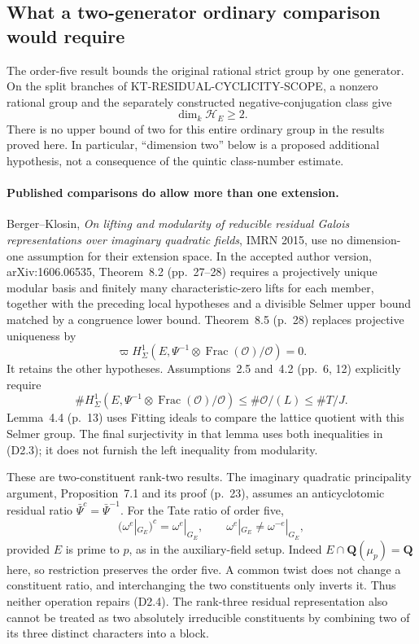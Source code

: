 \subsection{What a two-generator ordinary comparison would require}

The order-five result bounds the original rational strict group by
one generator.  On the split branches of
KT-RESIDUAL-CYCLICITY-SCOPE, a nonzero rational group and the
separately constructed negative-conjugation class give
\[
 \dim_k\mathcal H_E\geq2.                                      \tag{D2.1}
\]
There is no upper bound of two for this entire ordinary group in
the results proved here.  In particular, ``dimension two'' below
is a proposed additional hypothesis, not a consequence of the
quintic class-number estimate.

\paragraph{Published comparisons do allow more than one extension.}
Berger--Klosin, \emph{On lifting and modularity of reducible residual
Galois representations over imaginary quadratic fields}, IMRN 2015,
use no dimension-one assumption for their extension space.
In the accepted author version, arXiv:1606.06535, Theorem~8.2
(pp.~27--28) requires a projectively unique modular basis and
finitely many characteristic-zero lifts for each member, together
with the preceding local hypotheses and a divisible Selmer upper
bound matched by a congruence lower bound.  Theorem~8.5 (p.~28)
replaces projective uniqueness by
\[
 \varpi H^1_\Sigma
       (E,\Psi^{-1}\otimes\operatorname{Frac}(\mathcal O)/\mathcal O)
       =0.                                                     \tag{D2.2}
\]
It retains the other hypotheses.  Assumptions~2.5 and~4.2
(pp.~6, 12) explicitly require
\[
 \#H^1_\Sigma(E,\Psi^{-1}\otimes
              \operatorname{Frac}(\mathcal O)/\mathcal O)
       \leq\#\mathcal O/(L)\leq\#T/J.                          \tag{D2.3}
\]
Lemma~4.4 (p.~13) uses Fitting ideals to compare the lattice
quotient with this Selmer group.  The final surjectivity in that
lemma uses both inequalities in (D2.3); it does not furnish the
left inequality from modularity.

These are two-constituent rank-two results.  The imaginary
quadratic principality argument, Proposition~7.1 and its proof
(p.~23), assumes an anticyclotomic residual ratio
$\bar\Psi^c=\bar\Psi^{-1}$.  For the Tate ratio of order five,
\[
 (\omega^{e}|_{G_E})^c=\omega^{e}|_{G_E},
 \qquad \omega^{e}|_{G_E}\ne\omega^{-e}|_{G_E},                 \tag{D2.4}
\]
provided $E$ is prime to $p$, as in the auxiliary-field setup.
Indeed $E\cap\mathbf Q(\mu_p)=\mathbf Q$ here, so restriction
preserves the order five.  A common twist does not change a
constituent ratio, and interchanging the two constituents only
inverts it.  Thus neither operation repairs (D2.4).
The rank-three residual representation also cannot be treated as
two absolutely irreducible constituents by combining two of its
three distinct characters into a block.

